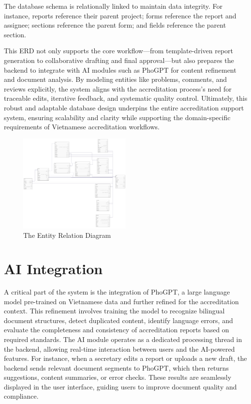 The database schema is relationally linked to maintain data integrity. For instance, reports reference their parent project; forms reference the report and assignee; sections reference the parent form; and fields reference the parent section. 

This ERD not only supports the core workflow—from template-driven report generation to collaborative drafting and final approval—but also prepares the backend to integrate with AI modules such as PhoGPT for content refinement and document analysis. By modeling entities like problems, comments, and reviews explicitly, the system aligns with the accreditation process’s need for traceable edits, iterative feedback, and systematic quality control. Ultimately, this robust and adaptable database design underpins the entire accreditation support system, ensuring scalability and clarity while supporting the domain-specific requirements of Vietnamese accreditation workflows.
\begin{figure}[h]
    \centering
    \includegraphics[width=0.5\textwidth]{images/ERD.png}
    \caption{The Entity Relation Diagram} 
    \label{fig:erd}
\end{figure}

\section{AI Integration}

A critical part of the system is the integration of PhoGPT, a large language model pre-trained on Vietnamese data and further refined for the accreditation context. This refinement involves training the model to recognize bilingual document structures, detect duplicated content, identify language errors, and evaluate the completeness and consistency of accreditation reports based on required standards. The AI module operates as a dedicated processing thread in the backend, allowing real-time interaction between users and the AI-powered features. For instance, when a secretary edits a report or uploads a new draft, the backend sends relevant document segments to PhoGPT, which then returns suggestions, content summaries, or error checks. These results are seamlessly displayed in the user interface, guiding users to improve document quality and compliance.
